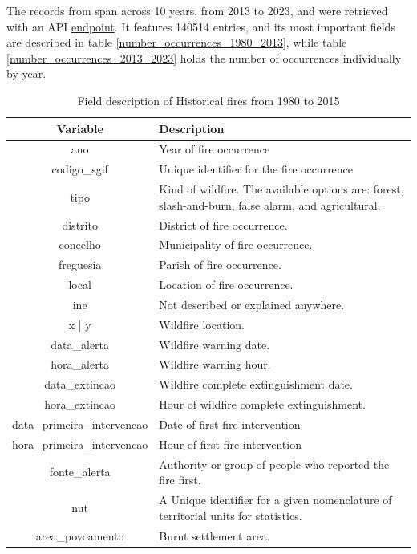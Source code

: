 The records from \cite{icnf2024} span across 10 years, from 2013 to 2023, and were retrieved with an API \href{https://fogos.icnf.pt/localizador/webserviceocorrencias.asp?ano=YEAR}{endpoint}. It features 140514 entries, and its most important fields are described in table \ref{number_occurrences_1980_2013}, while table \ref{number_occurrences_2013_2023} holds the number of occurrences individually by year.

\begin{table}[H]
	\caption{Field description of Historical fires from 1980 to 2015 \cite{centraldedados_incendios_website, centraldedados_incendios}}
	\label{historical_occurrences_1980_2015}
	\centering
	\small
	\begin{tabular}{cp{7.5cm}} %
		\hline
		\textbf{Variable} & \textbf{Description}\\
		\hline
		ano  & Year of fire occurrence \\
		codigo\_sgif & Unique identifier for the fire occurrence \\
		tipo  & Kind of wildfire. The available options are: forest, slash-and-burn, false alarm, and agricultural.\\
		distrito  & District of fire occurrence. \\
		concelho  & Municipality of fire occurrence. \\
		freguesia  & Parish of fire occurrence.\\
		local  & Location of fire occurrence. \\
		ine  & Not described or explained anywhere. \\
		x | y  & Wildfire location. \\
		data\_alerta  & Wildfire warning date. \\
		hora\_alerta  & Wildfire warning hour. \\
		data\_extincao & Wildfire complete extinguishment date. \\
		hora\_extincao & Hour of wildfire complete extinguishment. \\
		data\_primeira\_intervencao & Date of first fire intervention \\
		hora\_primeira\_intervencao & Hour of first fire intervention \\
		fonte\_alerta & Authority or group of people who reported the fire first. \\
		nut & A Unique identifier for a given nomenclature of territorial units for statistics. \\
		area\_povoamento & Burnt settlement area. \\

\end{tabular}
\end{table}
